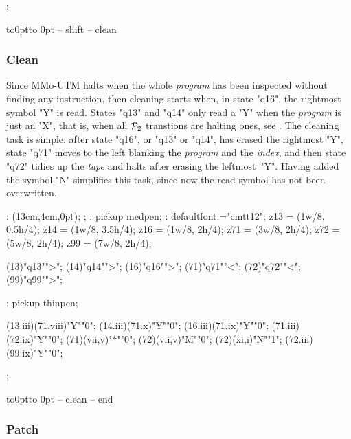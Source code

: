 \MTendfig;

\par\kern-12pt\vbox to0pt{\kern-14.4pt\hbox to 0pt{\kern3cm\box\MTbox\hss}\vss}
-- shift
-- clean


\subsubsection{Clean}

Since MMo-UTM halts when the whole {\em program}
has been inspected without finding any instruction,
then cleaning starts when, in state "q16",
the rightmost symbol "Y" is read.
States "q13" and "q14" only read a "Y" when
 the {\em program} is just an "X",
that is, when all ${\cal P}_2$ transtions are halting ones,
see .
The cleaning task is simple:
 after state "q16", or "q13" or "q14", has erased the rightmost "Y",
 state "q71" moves to the left blanking the {\em program}
and the {\em index}, and then state "q72" tidies up the {\em tape}
and halts after erasing the leftmost~"Y".
Having added the symbol "N" simplifies this task,
since now the read symbol has not been overwritten.

\MT:
\MTbeginfig(13cm,4cm,0pt);
\MTresetpa;
\MT: pickup medpen;
\MT: defaultfont:="cmtt12";
\MTcode
 z13 = (1w/8, 0.5h/4);
 z14 = (1w/8, 3.5h/4);
 z16 = (1w/8, 2h/4);
 z71 = (3w/8, 2h/4);
 z72 = (5w/8, 2h/4);
 z99 = (7w/8, 2h/4);

\MTstate(13)"q13"">";
\MTstate(14)"q14"">";
\MTstate(16)"q16"">";
\MTstate(71)"q71""<";
\MTstate(72)"q72""<";
\MTstate(99)"q99"">";

\MT: pickup thinpen;

\MTinput(13.iii)(71.viii)"Y""0";
\MTinput(14.iii)(71.x)"Y""0";
\MTinput(16.iii)(71.ix)"Y""0";
\MTinput(71.iii)(72.ix)"Y""0";
\MTauto(71)(vii,v)"*""0";
\MTauto(72)(vii,v)"M""0";
\MTauto(72)(xi,i)"N""1";
\MTinput(72.iii)(99.ix)"Y""0";

\MTendfig;

\par\kern-12pt\vbox to0pt{\kern12pt\hbox to 0pt{\kern3.5cm\box\MTbox\hss}\vss}
-- clean
-- end


\vfil\break

\subsubsection{Patch}

